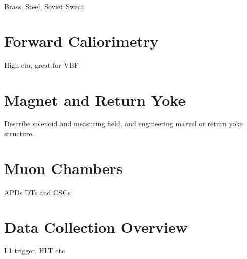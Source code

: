 \par Brass, Steel, Soviet Sweat

\section{Forward Caliorimetry}
\label{fcal_description}

\par High eta, great for VBF

\section{Magnet and Return Yoke}
\label{magnet_description}

\par Describe solenoid and measuring field, and engineering marvel or
return yoke structure.

\section{Muon Chambers}
\label{muon_chamber_description}

\par APDs DTs and CSCs

\section{Data Collection Overview}
\label{data_collection_description}

\par L1 trigger, HLT etc

